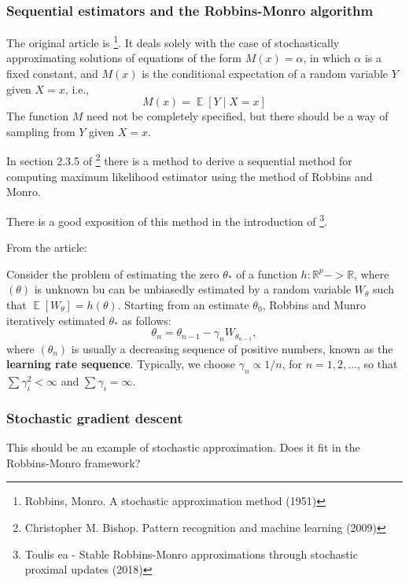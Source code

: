 \documentclass[11pt]{article}
\renewcommand{\em}[1]{\textbf{#1}}
\newcommand{\E}[1]{\operatorname{\mathbb{E}}[#1]}
\begin{document}
\subsubsection{Sequential estimators and the Robbins-Monro algorithm}
\label{sec-1-2-1}
The original article is \footnote{Robbins, Monro. A stochastic approximation method (1951)}. It deals solely with the case of stochastically
approximating solutions of equations of the form $M(x) = \alpha$, in which
$\alpha$ is a fixed constant, and $M(x)$ is the conditional expectation of a
random variable $Y$ given $X = x$, i.e.,
\begin{equation}
M(x) = \E{Y \mid X=x}
\end{equation}
The function $M$ need not be completely specified, but there should be a way of sampling
from $Y$ given $X=x$.

In section 2.3.5 of \footnote{Christopher M. Bishop. Pattern recognition and machine learning (2009)} there is a method to derive a sequential method for
computing maximum likelihood estimator using the method of Robbins and Monro.

There is a good exposition of this method in the introduction of \footnote{Toulis ea - Stable Robbins-Monro approximations through stochastic proximal updates (2018)}.

From the article:

Consider the problem of estimating the zero $\theta_*$ of a function $h:
\mathbb{R}^p -> \mathbb{R}$, where $(\theta)$ is unknown bu can be unbiasedly
estimated by a random variable $W_{\theta}$ such that $\E{W_{\theta}} =
h(\theta)$. Starting from an estimate $\theta_0$, Robbins and Munro iteratively
estimated $\theta_*$ as follows:
\begin{equation}
\theta_n = \theta_{n - 1} - \gamma_n W_{\theta_{n - 1}},
\end{equation}
where $(\theta_n)$ is usually a decreasing sequence of positive numbers, known
as the \em{learning rate sequence}. Typically, we choose $\gamma_n \propto 1 /
n$, for $n = 1, 2, \ldots$, so that $\sum \gamma_i^2 < \infty$ and $\sum
\gamma_i = \infty$.

\subsubsection{Stochastic gradient descent}
\label{sec-1-2-2}
This should be an example of stochastic approximation. Does it fit in the
Robbins-Monro framework?
\end{document}
